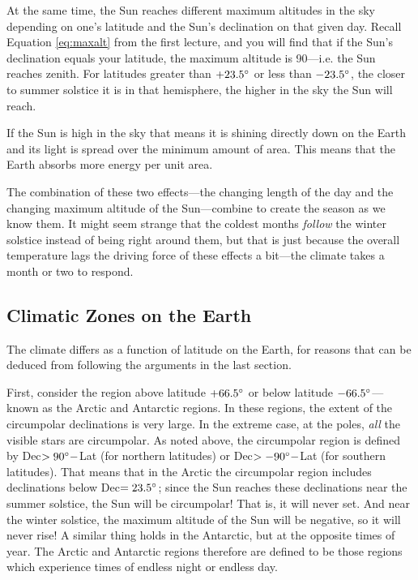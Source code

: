 \documentclass[12pt, preprint]{aastex}
\begin{document}
At the same time, the Sun reaches different maximum altitudes in the
sky depending on one's latitude and the Sun's declination on that
given day. Recall Equation \ref{eq:maxalt} from the first lecture, and
you will find that if the Sun's declination equals your latitude, the
maximum altitude is 90\degree---i.e. the Sun reaches zenith. For
latitudes greater than $+23.5{}^\circ$ or less than $-23.5{}^\circ$, the
closer to summer solstice it is in that hemisphere, the higher in the
sky the Sun will reach.

If the Sun is high in the sky that means it is shining directly down
on the Earth and its light is spread over the minimum amount of
area. This means that the Earth absorbs more energy per unit
area.

The combination of these two effects---the changing length of the day
and the changing maximum altitude of the Sun---combine to create the
season as we know them. It might seem strange that the coldest months
{\it follow} the winter solstice instead of being right around them,
but that is just because the overall temperature lags the driving
force of these effects a bit---the climate takes a month or two to
respond.

\subsection{Climatic Zones on the Earth}

The climate differs as a function of latitude on the Earth, for
reasons that can be deduced from following the arguments in the last
section.

First, consider the region above latitude $+66.5{}^\circ$ or below
latitude $-66.5{}^\circ$---known as the Arctic and Antarctic
regions. In these regions, the extent of the circumpolar declinations
is very large. In the extreme case, at the poles, {\it all} the
visible stars are circumpolar. As noted above, the circumpolar region
is defined by Dec$>90{}^\circ-$Lat (for northern latitudes) or
Dec$>-90{}^\circ-$Lat (for southern latitudes). That means that in the
Arctic the circumpolar region includes declinations below
Dec$=23.5{}^\circ$; since the Sun reaches these declinations near the
summer solstice, the Sun will be circumpolar! That is, it will never
set. And near the winter solstice, the maximum altitude of the Sun
will be negative, so it will never rise! A similar thing holds in the
Antarctic, but at the opposite times of year. The Arctic and Antarctic
regions therefore are defined to be those regions which experience
times of endless night or endless day.
\end{document}
